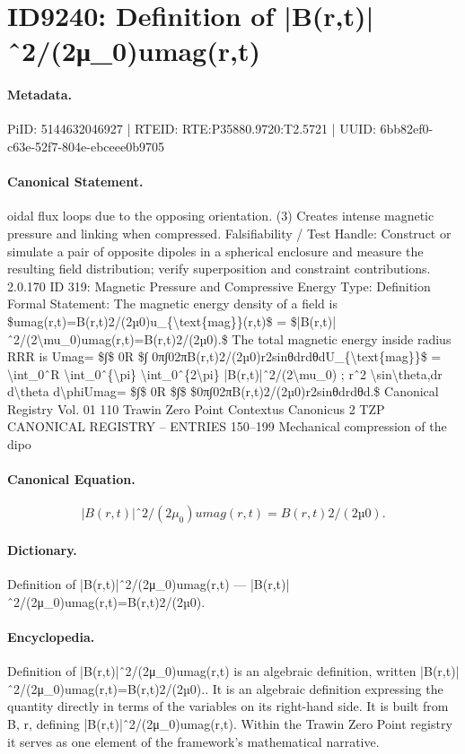 \section*{ID9240: Definition of |B(r,t)|ˆ2/(2μ\_0)umag(r,t)}
\paragraph{Metadata.}
PiID: 5144632046927 | RTEID: RTE:P35880.9720:T2.5721 | UUID: 6bb82ef0-c63e-52f7-804e-ebceee0b9705

\paragraph{Canonical Statement.}
oidal flux loops due to the opposing orientation. (3) Creates intense magnetic pressure and linking when compressed. Falsifiability / Test Handle: Construct or simulate a pair of opposite dipoles in a spherical enclosure and measure the resulting field distribution; verify superposition and constraint contributions. 2.0.170 ID 319: Magnetic Pressure and Compressive Energy Type: Definition Formal Statement: The magnetic energy density of a field is \$umag(r,t)=B(r,t)2/(2µ0)u\_\{\textbackslash{}text\{mag\}\}(r,t)\$ = \$|B(r,t)|ˆ2/(2\textbackslash{}mu\_0)umag(r,t)=B(r,t)2/(2µ0).\$ The total magnetic energy inside radius RRR is Umag= \$∫\$ 0R \$∫ 0π∫02πB(r,t)2/(2µ0)r2sinθdrdθdU\_\{\textbackslash{}text\{mag\}\}\$ = \textbackslash{}int\_0ˆR \textbackslash{}int\_0ˆ\{\textbackslash{}pi\} \textbackslash{}int\_0ˆ\{2\textbackslash{}pi\} |B(r,t)|ˆ2/(2\textbackslash{}mu\_0) ; rˆ2 \textbackslash{}sin\textbackslash{}theta,dr d\textbackslash{}theta d\textbackslash{}phiUmag= \$∫\$ 0R \$∫\$ \$0π∫02πB(r,t)2/(2µ0)r2sinθdrdθd.\$ Canonical Registry Vol. 01 110 Trawin Zero Point Contextus Canonicus 2 TZP CANONICAL REGISTRY – ENTRIES 150–199 Mechanical compression of the dipo

\paragraph{Canonical Equation.}
\[
|B(r,t)|ˆ2/(2\mu_0)umag(r,t)=B(r,t)2/(2µ0).
\]

\paragraph{Dictionary.}
Definition of |B(r,t)|ˆ2/(2μ\_0)umag(r,t) — |B(r,t)|ˆ2/(2μ\_0)umag(r,t)=B(r,t)2/(2µ0).

\paragraph{Encyclopedia.}
Definition of |B(r,t)|ˆ2/(2μ\_0)umag(r,t) is an algebraic definition, written |B(r,t)|ˆ2/(2μ\_0)umag(r,t)=B(r,t)2/(2µ0).. It is an algebraic definition expressing the quantity directly in terms of the variables on its right-hand side. It is built from B, r, defining |B(r,t)|ˆ2/(2μ\_0)umag(r,t). Within the Trawin Zero Point registry it serves as one element of the framework's mathematical narrative.
